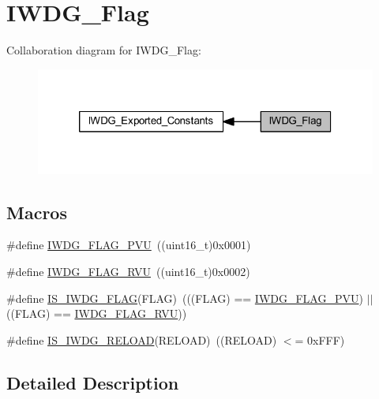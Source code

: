 \hypertarget{group___i_w_d_g___flag}{}\section{I\+W\+D\+G\+\_\+\+Flag}
\label{group___i_w_d_g___flag}
Collaboration diagram for I\+W\+D\+G\+\_\+\+Flag\+:
\nopagebreak
\begin{figure}[H]
\begin{center}
\leavevmode
\includegraphics[width=320pt]{group___i_w_d_g___flag}
\end{center}
\end{figure}
\subsection*{Macros}
\begin{DoxyCompactItemize}
\item 
\#define \hyperlink{group___i_w_d_g___flag_gae20afcf399fad1534e79a8d30ea86c9c}{I\+W\+D\+G\+\_\+\+F\+L\+A\+G\+\_\+\+P\+VU}~((uint16\+\_\+t)0x0001)
\item 
\#define \hyperlink{group___i_w_d_g___flag_ga3731bf2711c234ffe5b405fb6634ebca}{I\+W\+D\+G\+\_\+\+F\+L\+A\+G\+\_\+\+R\+VU}~((uint16\+\_\+t)0x0002)
\item 
\#define \hyperlink{group___i_w_d_g___flag_ga5be9ae9ba267cf09a00523ef3e219293}{I\+S\+\_\+\+I\+W\+D\+G\+\_\+\+F\+L\+AG}(F\+L\+AG)~(((F\+L\+AG) == \hyperlink{group___i_w_d_g___flag_gae20afcf399fad1534e79a8d30ea86c9c}{I\+W\+D\+G\+\_\+\+F\+L\+A\+G\+\_\+\+P\+VU}) $\vert$$\vert$ ((F\+L\+AG) == \hyperlink{group___i_w_d_g___flag_ga3731bf2711c234ffe5b405fb6634ebca}{I\+W\+D\+G\+\_\+\+F\+L\+A\+G\+\_\+\+R\+VU}))
\item 
\#define \hyperlink{group___i_w_d_g___flag_ga7c319e96bded8e3c38c6a42a1b335c68}{I\+S\+\_\+\+I\+W\+D\+G\+\_\+\+R\+E\+L\+O\+AD}(R\+E\+L\+O\+AD)~((R\+E\+L\+O\+AD) $<$= 0x\+F\+F\+F)
\end{DoxyCompactItemize}


\subsection{Detailed Description}


